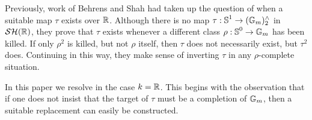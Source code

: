 Previously, work of Behrens and Shah \cite{BehrensShah} had taken up the question of when a suitable map $\tau$ exists over $\mathbb{R}$. 
Although there is no map $\tau:\operatorname{\mathbb{S}}^1 \to (\mathbb{G}_m)^{\wedge}_2$ in $\mathcal{SH}(\mathbb{R})$,
they prove that $\tau$ exists whenever a different class $\rho:\operatorname{\mathbb{S}}^0 \to \mathbb{G}_m$ has been killed.
If only $\rho^2$ is killed, but not $\rho$ itself, then $\tau$ does not necessarily exist, but $\tau^2$ does.
Continuing in this way, they make sense of inverting $\tau$ in any $\rho$-complete situation.



In this paper we resolve  in the case $k=\mathbb{R}$.
This begins with the observation that if one does not insist that the target of $\tau$ must be a completion of $\mathbb{G}_m$, then a suitable replacement can easily be constructed.


